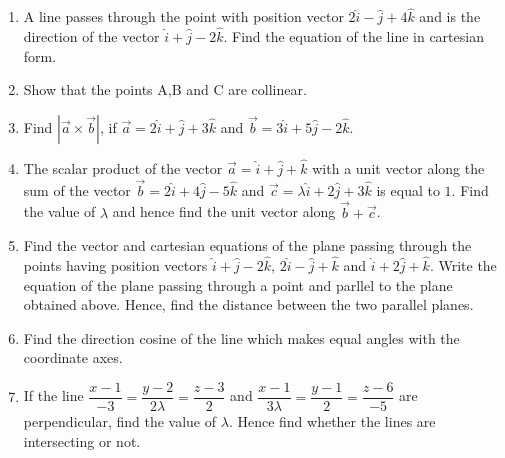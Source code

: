 \begin{enumerate}


\item A line passes through the point with position vector 
$2\hat{i} - \hat{j} + 4\hat{k} $ and is the direction of the vector 
$\hat{i} + \hat{j} - 2\hat{k} $. 
Find the equation of the line in cartesian form.

\item Show that the points 
A,B
and C are collinear.

\item Find
$|\overrightarrow{a} \times \overrightarrow{b}|$,
if $\overrightarrow{a}=2\hat{i}+\hat{j}+3\hat{k}$ and
$\overrightarrow{b}=3\hat{i}+5\hat{j}-2\hat{k}$.   

\item The scalar product of the vector 
$\overrightarrow{a} = \hat{i} + \hat{j} + \hat{k}$
with a unit vector along the sum of the vector 
$\overrightarrow{b} = 2\hat{i} + 4\hat{j} - 5\hat{k}$ and
$\overrightarrow{c} = \lambda \hat{i} + 2\hat{j} + 3\hat{k}$ 
is equal to $1$. Find the value of $\lambda$ and hence find 
the unit vector along 
$\overrightarrow{b} + \overrightarrow{c}$.

\item Find the vector and cartesian equations of the plane
passing through the points having position vectors 
$\hat{i} + \hat{ j} - 2\hat{k}$, $2\hat{i}-\hat{j} + \hat{k}$ 
and $\hat{i} + 2\hat{j} + \hat{k}$. Write the equation of the 
plane passing through a point  and parllel to 
the plane obtained above. Hence, find the distance between the 
two parallel planes.

\item Find the direction cosine of the line which makes 
equal angles with the coordinate axes. 

\item If the line 
$\dfrac{x-1}{-3} = \dfrac{y-2}{2\lambda} = \dfrac{z-3}{2} $ and 
$\dfrac{x-1}{3\lambda} = \dfrac{y-1}{2}  = \dfrac{z-6}{-5}$ 
are perpendicular, find the value of $\lambda$. 
Hence find whether the lines are intersecting or not.
\end{enumerate}
